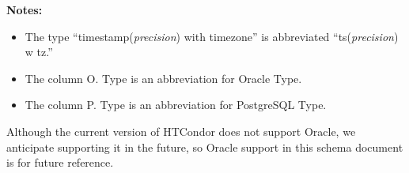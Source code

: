 \newcommand{\qp}{{Q}uill}
\newcommand{\ca}{{C}lass{A}d}
\newcommand{\cas}{{C}lass{A}ds}
\newcommand{\pg}{{P}ostgre{SQL}}
\newcommand{\oc}{{O}racle}
\newcommand{\db}{{D}bmsd}

\noindent \textbf{Notes:}
\begin{itemize}
\item The type ``timestamp(\textit{precision}) with timezone'' is
abbreviated ``ts(\textit{precision}) w tz.''
\item The column O. Type is an abbreviation for Oracle Type.
\item The column P. Type is an abbreviation for {PostgreSQL} Type.
\end{itemize}
Although the current version of HTCondor does not support Oracle, we
anticipate supporting it in the future, so Oracle support in this
schema document is for future reference.
\vspace{24pt}

